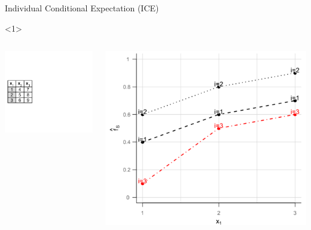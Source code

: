 \documentclass[11pt,compress,t,notes=noshow, xcolor=table]{beamer}
\begin{document}
\begin{vbframe}{Individual Conditional Expectation (ICE)}
\begin{onlyenv}<1>
  \vspace{1cm}
    \begin{columns}[T]
\begin{column}{0.5\textwidth}
\centering
\includegraphics[page=7, width=\textwidth]{figure_man/ice_pd_plot_demo}
\end{column}
\begin{column}{0.5\textwidth}
\vspace{0.3cm}

\begin{center}
\includegraphics[width=1\textwidth]{figure_man/ICE04.png}
\end{center}


\end{column}
\end{columns}
\end{onlyenv}
\end{vbframe}
\end{document}
